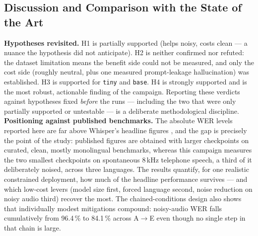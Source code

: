\documentclass[12pt]{report}
\begin{document}
\subsection{Discussion and Comparison with the State of the Art}
\textbf{Hypotheses revisited.} H1 is partially supported (helps noisy, costs clean --- a nuance the hypothesis did not anticipate). H2 is neither confirmed nor refuted: the dataset limitation means the benefit side could not be measured, and only the cost side (roughly neutral, plus one measured prompt-leakage hallucination) was established. H3 is supported for \texttt{tiny} and \texttt{base}. H4 is strongly supported and is the most robust, actionable finding of the campaign. Reporting these verdicts against hypotheses fixed \emph{before} the runs --- including the two that were only partially supported or untestable --- is a deliberate methodological discipline.
\textbf{Positioning against published benchmarks.} The absolute WER levels reported here are far above Whisper's headline figures \cite{radford2023robust}, and the gap is precisely the point of the study: published figures are obtained with larger checkpoints on curated, clean, mostly monolingual benchmarks, whereas this campaign measures the two smallest checkpoints on spontaneous 8\,kHz telephone speech, a third of it deliberately noised, across three languages. The results quantify, for one realistic constrained deployment, how much of the headline performance survives --- and which low-cost levers (model size first, forced language second, noise reduction on noisy audio third) recover the most. The chained-conditions design also shows that individually modest mitigations compound: noisy-audio WER falls cumulatively from 96.4\,\% to 84.1\,\% across A$\to$E even though no single step in that chain is large.
\end{document}
